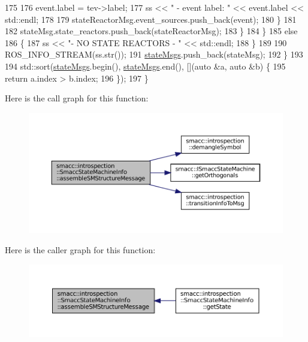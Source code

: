 \begin{DoxyCode}
175 
176                         \textcolor{keyword}{event}.label = tev->label;
177                         ss << \textcolor{stringliteral}{"                 - event label: "} << \textcolor{keyword}{event}.label << std::endl;
178 
179                         stateReactorMsg.event\_sources.push\_back(event);
180                     \}
181 
182                     stateMsg.state\_reactors.push\_back(stateReactorMsg);
183                 \}
184             \}
185             \textcolor{keywordflow}{else}
186             \{
187                 ss << \textcolor{stringliteral}{"- NO STATE REACTORS - "} << std::endl;
188             \}
189 
190             ROS\_INFO\_STREAM(ss.str());
191             \hyperlink{classsmacc_1_1introspection_1_1SmaccStateMachineInfo_a48e3ff7bbe2673d23e6942234446ebee}{stateMsgs}.push\_back(stateMsg);
192         \}
193 
194         std::sort(\hyperlink{classsmacc_1_1introspection_1_1SmaccStateMachineInfo_a48e3ff7bbe2673d23e6942234446ebee}{stateMsgs}.begin(), \hyperlink{classsmacc_1_1introspection_1_1SmaccStateMachineInfo_a48e3ff7bbe2673d23e6942234446ebee}{stateMsgs}.end(), [](\textcolor{keyword}{auto} &a, \textcolor{keyword}{auto} &b) \{
195             \textcolor{keywordflow}{return} a.index > b.index;
196         \});
197     \}
\end{DoxyCode}
Here is the call graph for this function\+:
\nopagebreak
\begin{figure}[H]
\begin{center}
\leavevmode
\includegraphics[width=350pt]{classsmacc_1_1introspection_1_1SmaccStateMachineInfo_a6758065a8d1faaa7c3688cf0dffe9334_cgraph}
\end{center}
\end{figure}
Here is the caller graph for this function\+:
\nopagebreak
\begin{figure}[H]
\begin{center}
\leavevmode
\includegraphics[width=350pt]{classsmacc_1_1introspection_1_1SmaccStateMachineInfo_a6758065a8d1faaa7c3688cf0dffe9334_icgraph}
\end{center}
\end{figure}
